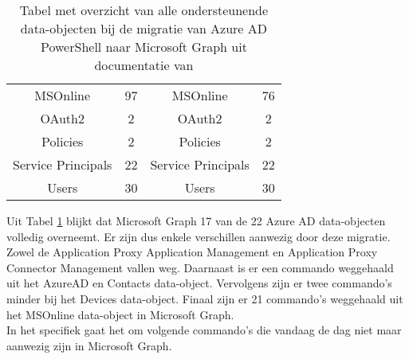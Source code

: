 \begin{table}
\begin{adjustbox}{max width=\textwidth}
\begin{tabular}{ |c|c||c|c| }
        MSOnline & 97 & MSOnline & 76 \\
        OAuth2 & 2 & OAuth2 & 2 \\ 
        Policies & 2 & Policies & 2 \\ 
        Service Principals & 22 & Service Principals & 22 \\ 
        Users & 30 & Users & 30 \\ 
        \hline
    \end{tabular}
    \end{adjustbox}
    \caption[Tabel migratie Azure AD data-objecten naar Microsoft Graph]{Tabel met overzicht van alle ondersteunende data-objecten bij de migratie van Azure \ac{AD} PowerShell naar Microsoft Graph uit documentatie van \textcite{Microsoft2023l}}
    \label{AADMSG}
\end{table}

Uit Tabel \ref{AADMSG} blijkt dat Microsoft Graph 17 van de 22 Azure \ac{AD} data-objecten volledig overneemt. Er zijn dus enkele verschillen aanwezig door deze migratie. Zowel de Application Proxy Application Management en Application Proxy Connector Management vallen weg. Daarnaast is er een commando weggehaald uit het AzureAD en Contacts data-object. Vervolgens zijn er twee commando's minder bij het Devices data-object. Finaal zijn er 21 commando's weggehaald uit het MSOnline data-object in Microsoft Graph. \\

In het specifiek gaat het om volgende commando's die vandaag de dag niet maar aanwezig zijn in Microsoft Graph.

